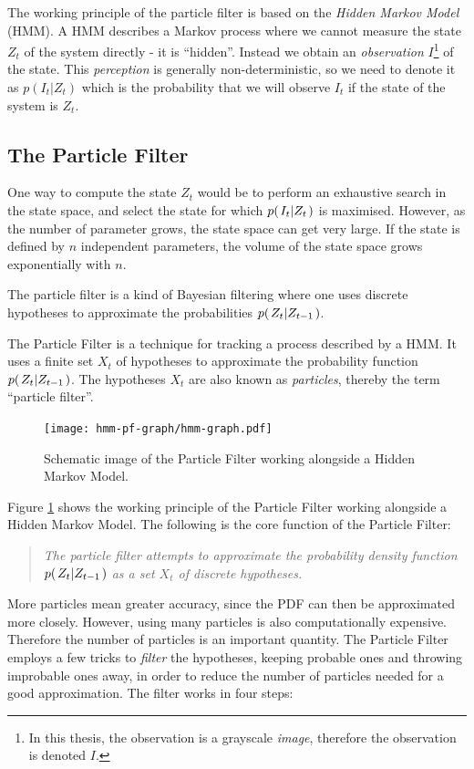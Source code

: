 The working principle of the particle filter is based on the \emph{Hidden Markov Model} (HMM). A HMM describes a Markov process where we cannot measure the state $Z_t$ of the system directly - it is ``hidden''\cite{EncyclopediaMachineLearning}. Instead we obtain an \emph{observation} $I$\footnote{In this thesis, the observation is a grayscale \emph{image}, therefore the observation is denoted $I$.}  of the state. This \emph{perception} is generally non-deterministic, so we need to denote it as $p(I_t|Z_t)$ which is the probability that we will observe $I_t$ if the state of the system is $Z_t$.

\subsection{The Particle Filter}

One way to compute the state $Z_t$ would be to perform an exhaustive search in the state space, and select the state for which $p{(\left. I_t \middle\vert Z_t \right.)}$ is maximised. However, as the number of parameter grows, the state space can get very large. If the state is defined by $n$ independent parameters, the volume of the state space grows exponentially with $n$.

The particle filter is a kind of Bayesian filtering where one uses discrete hypotheses to approximate the probabilities $p{(\left. Z_t \middle\vert Z_{t-1} \right.)}$.


The Particle Filter is a technique for tracking a process described by a HMM. It uses a finite set $X_t$ of hypotheses to approximate the probability function $p{(\left. Z_t \middle\vert Z_{t-1} \right.)}$. The hypotheses $X_t$ are also known as \emph{particles}, thereby the term ``particle filter''.

\begin{figure}
  \centering
  \texttt{[image: hmm-pf-graph/hmm-graph.pdf]}
  \caption{Schematic image of the Particle Filter working alongside a Hidden Markov Model.}
  \label{fig:hmm-graph}
\end{figure}

Figure \ref{fig:hmm-graph} shows the working principle of the Particle Filter working alongside a Hidden Markov Model. The following is the core function of the Particle Filter:

\begin{quote}
  \emph{The particle filter attempts to approximate the probability density function $p{(\left. Z_t \middle\vert Z_{t-1} \right.)}$ as a set $X_t$ of discrete hypotheses.}
\end{quote}

More particles mean greater accuracy, since the PDF can then be approximated more closely. However, using many particles is also computationally expensive. Therefore the number of particles is an important quantity. The Particle Filter employs a few tricks to \emph{filter} the hypotheses, keeping probable ones and throwing improbable ones away, in order to reduce the number of particles needed for a good approximation. The filter works in four steps:

